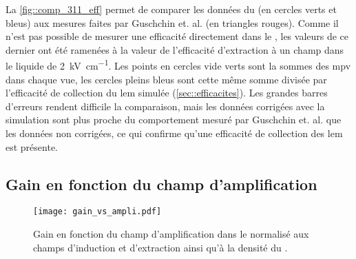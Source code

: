       La \autoref{fig::comp_311_eff} permet de comparer les données du \TOO{} (en cercles verts et bleus) aux mesures faites par Guschchin et. al.\cite{guschin} (en triangles rouges). Comme il n'est pas possible de mesurer une efficacité directement dans le \TOO{}, les valeurs de ce dernier ont été ramenées à la valeur de l'efficacité d'extraction à un champ dans le liquide de \SI{2}{\kilo\volt\per\centi\meter}. Les points en cercles vide verts sont la sommes des \gls{mpv} dans chaque vue, les cercles pleins bleus sont cette même somme divisée par l'efficacité de collection du \gls{lem} simulée (\autoref{sec::efficacites}). Les grandes barres d'erreurs rendent difficile la comparaison, mais les données corrigées avec la simulation sont plus proche du comportement mesuré par Guschchin et. al. que les données non corrigées, ce qui confirme qu'une efficacité de collection des \gls{lem} est présente.

    \subsection{Gain en fonction du champ d'amplification}\label{sec::result_gain}

      \begin{figure}[htbp]
        \centering
        \texttt{[image: gain\_vs\_ampli.pdf]}
        \caption[Gain en fonction du champ d'amplification.]{\label{fig::gain_vs_ampli}Gain en fonction du champ d'amplification dans le \TOO{} normalisé aux champs d'induction et d'extraction ainsi qu'à la densité du \threeL{}.}
      \end{figure}

